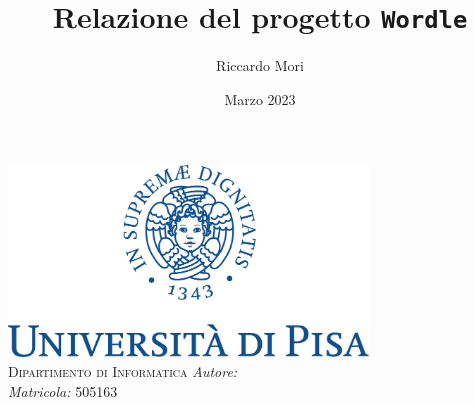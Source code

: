 \documentclass{article}
\title{Relazione del progetto \texttt{Wordle}}
\author{Riccardo Mori}
\date{Marzo 2023}
\begin{document}
	
	\begin{titlepage}
		\centering
		\includegraphics[height=12pc]{img/marchio_unipi.pdf} \\
		\null
		\textsc{\huge Dipartimento di Informatica}
		\vfill
		{\huge{\@title}}
		\vfill
		\emph{Autore:} \@author \\
		\emph{Matricola:} 505163 \\
		\@date
	\end{titlepage}
	
	\tableofcontents
	\pagebreak
	
	
	
	
	
	
	
	
	\newpage
	
	\appendix
	
	
\end{document}
